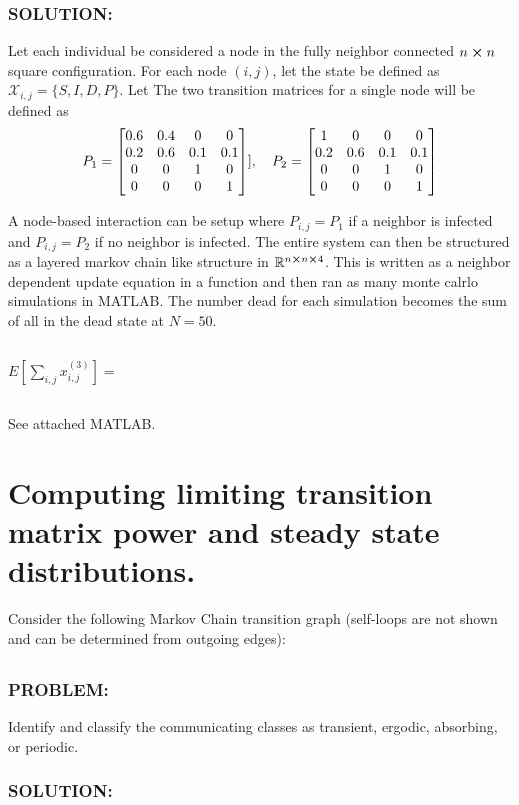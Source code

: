\documentclass[]{article}
\newcommand{\Problem}{\subsubsection*{\textbf{PROBLEM:}}}
\newcommand{\Solution}{\subsubsection*{\textbf{SOLUTION:}}}
\newcommand{\R}{\mathbb{R}}
\begin{document}
\Solution
Let each individual be considered a node in the fully neighbor connected $n \cross n$ square configuration.
For each node $(i,j)$, let the state be defined as $\mathcal{X}_{i,j} = \{S,I,D,P\}$.
Let The two transition matrices for a single node will be defined as 
\[
    P_1 = \mqty[
        0.6 & 0.4 & 0   & 0   \\
        0.2 & 0.6 & 0.1 & 0.1 \\
        0   & 0   & 1   & 0   \\
        0   & 0   & 0   & 1]
    ], \quad P_2 = \mqty[
        1   & 0   & 0   & 0   \\
        0.2 & 0.6 & 0.1 & 0.1 \\
        0   & 0   & 1   & 0   \\
        0   & 0   & 0   & 1]
\]

A node-based interaction can be setup where $P_{i,j} = P_1$ if a neighbor is infected and $P_{i,j} = P_2$ if no neighbor is infected.
The entire system can then be structured as a layered markov chain like structure in $\R^{n\cross n \cross 4}$.
This is written as a neighbor dependent update equation in a function and then ran as many monte calrlo simulations in MATLAB. 
The number dead for each simulation becomes the sum of all in the dead state at $N=50$.

\subsection{}
$E[\sum_{i,j} x_{i,j}^{(3)}] = $


\subsection{}


See attached MATLAB.


\newpage
\section{Computing limiting transition matrix power and steady state distributions.}
Consider the following Markov Chain transition graph (self-loops are not shown and can be determined from outgoing edges):
\begin{figure}[h]
    
\end{figure}

\subsection{}
\Problem
Identify and classify the communicating classes as transient, ergodic, absorbing, or periodic.
\Solution
\end{document}
